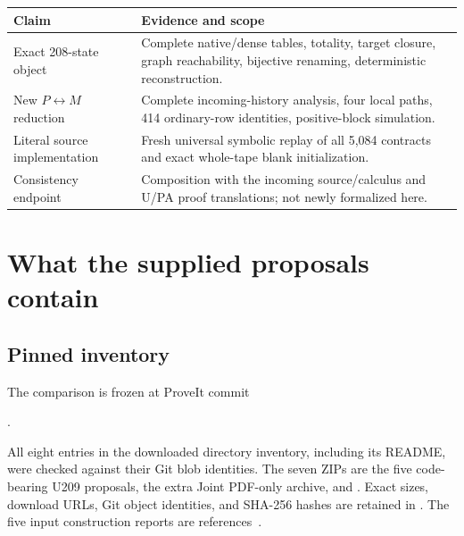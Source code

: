 \documentclass[11pt,letterpaper]{article}
\begin{document}
\begin{center}\small
\begin{tabularx}{\linewidth}{@{}>{\raggedright\arraybackslash}p{36mm}X@{}}
\toprule
Claim & Evidence and scope\\
\midrule
Exact 208-state object & Complete native/dense tables, totality, target
closure, graph reachability, bijective renaming, deterministic reconstruction.\\
New $P\leftrightarrow M$ reduction & Complete incoming-history analysis,
four local paths, 414 ordinary-row identities, positive-block simulation.\\
Literal source implementation & Fresh universal symbolic replay of all
5,084 contracts and exact whole-tape blank initialization.\\
Consistency endpoint & Composition with the incoming source/calculus and
U/PA proof translations; not newly formalized here.\\
\bottomrule
\end{tabularx}
\end{center}

\section{What the supplied proposals contain}
\subsection{Pinned inventory}

The comparison is frozen at ProveIt commit
\begin{center}\small
{}.
\end{center}
All eight entries in the downloaded directory inventory, including its
README, were checked against their Git blob identities. The seven ZIPs are
the five code-bearing U209 proposals, the extra Joint PDF-only archive, and
. Exact sizes, download URLs, Git object
identities, and SHA-256 hashes are retained in .
The five input construction reports are references~\cite{plain,composed,folds,joint,compat}.
\end{document}
